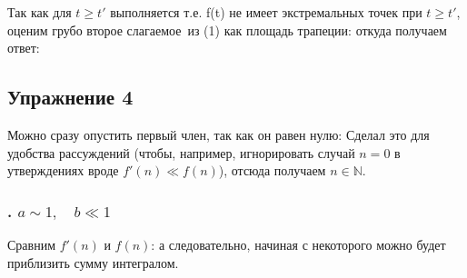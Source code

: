 \documentclass[a4paper, 12pt]{article}
\begin{document}
Так как для $t \ge t'$ выполняется
т.е. f(t) не имеет экстремальных точек при $t \ge t'$, оценим грубо второе слагаемое\
из (1) как площадь трапеции:
откуда получаем 
ответ:

\subsection*{Упражнение 4}
Можно сразу опустить первый член, так как он равен нулю:
Сделал это для удобства рассуждений (чтобы, например, игнорировать случай $n = 0$ в утверждениях вроде $f'(n) \ll f(n)$), отсюда получаем $n \in \mathbb{N}$.
\subsubsection*{\Rnum{1}. $a \sim 1,\quad b \ll 1$}
Сравним $f'(n)$ и $f(n)$:
а следовательно, начиная с некоторого
можно будет приблизить сумму интегралом.
\end{document}
